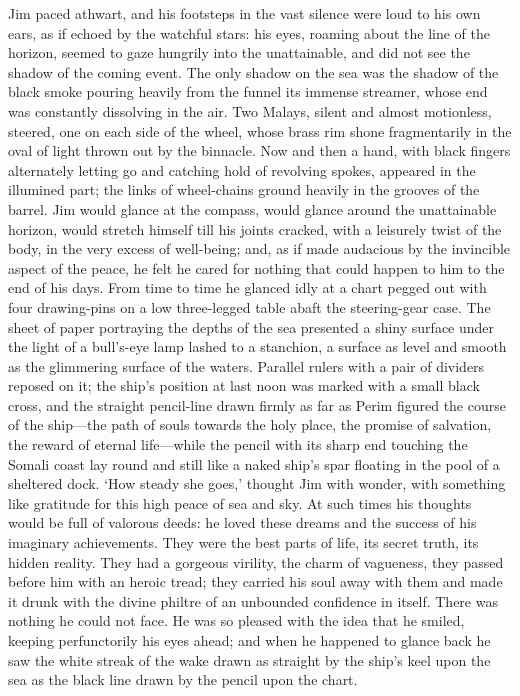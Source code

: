 Jim paced athwart, and his footsteps in the vast silence were loud to his own ears, as if echoed by the watchful stars: his eyes, roaming about the line of the horizon, seemed to gaze hungrily into the unattainable, and did not see the shadow of the coming event. The only shadow on the sea was the shadow of the black smoke pouring heavily from the funnel its immense streamer, whose end was constantly dissolving in the air. Two Malays, silent and almost motionless, steered, one on each side of the wheel, whose brass rim shone fragmentarily in the oval of light thrown out by the binnacle. Now and then a hand, with black fingers alternately letting go and catching hold of revolving spokes, appeared in the illumined part; the links of wheel-chains ground heavily in the grooves of the barrel. Jim would glance at the compass, would glance around the unattainable horizon, would stretch himself till his joints cracked, with a leisurely twist of the body, in the very excess of well-being; and, as if made audacious by the invincible aspect of the peace, he felt he cared for nothing that could happen to him to the end of his days. From time to time he glanced idly at a chart pegged out with four drawing-pins on a low three-legged table abaft the steering-gear case. The sheet of paper portraying the depths of the sea presented a shiny surface under the light of a bull’s-eye lamp lashed to a stanchion, a surface as level and smooth as the glimmering surface of the waters. Parallel rulers with a pair of dividers reposed on it; the ship’s position at last noon was marked with a small black cross, and the straight pencil-line drawn firmly as far as Perim figured the course of the ship—the path of souls towards the holy place, the promise of salvation, the reward of eternal life—while the pencil with its sharp end touching the Somali coast lay round and still like a naked ship’s spar floating in the pool of a sheltered dock. ‘How steady she goes,’ thought Jim with wonder, with something like gratitude for this high peace of sea and sky. At such times his thoughts would be full of valorous deeds: he loved these dreams and the success of his imaginary achievements. They were the best parts of life, its secret truth, its hidden reality. They had a gorgeous virility, the charm of vagueness, they passed before him with an heroic tread; they carried his soul away with them and made it drunk with the divine philtre of an unbounded confidence in itself. There was nothing he could not face. He was so pleased with the idea that he smiled, keeping perfunctorily his eyes ahead; and when he happened to glance back he saw the white streak of the wake drawn as straight by the ship’s keel upon the sea as the black line drawn by the pencil upon the chart.


